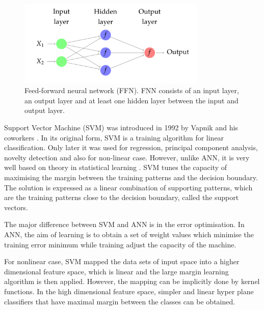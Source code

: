 \begin{figure}[!h]
  \centering
  \includegraphics[width=0.8\textwidth]{img/ffn}
  \caption{Feed-forward neural network (FFN). FNN consists of an input layer, an output layer and at least one hidden layer between the input and output layer. }
  \label{fig:ffn}
\end{figure}


Support Vector Machine (SVM) was introduced in 1992 by Vapnik and his coworkers
\cite{boser1992}. In its original form, SVM is a training algorithm for linear classification. Only later it was used for regression, principal component analysis, novelty detection and also for non-linear case.  However, unlike ANN, it is very well 
based on theory in statistical learning \cite{cortes1995}.  SVM tunes the capacity of 
maximising the margin between the training patterns and the decision boundary. The
solution is expressed as a linear combination of supporting patterns, which are the training patterns close to the decision boundary, called the support vectors.

The major difference between SVM and ANN is in the error optimisation. In ANN, the aim of learning is to obtain a set of weight values which minimise the training error 
minimum while training adjust the capacity of the machine. 

For nonlinear case, SVM mapped the data sets of input space into a higher dimensional feature space, which is linear and the large margin learning algorithm is then applied. However, the mapping can be implicitly done by kernel functions. In the high dimensional feature space, simpler and linear hyper plane classifiers that have maximal margin between the classes can be obtained.

\newpage
